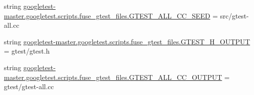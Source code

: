 \begin{DoxyCompactItemize}
\item 
string \mbox{\hyperlink{namespacegoogletest-master_1_1googletest_1_1scripts_1_1fuse__gtest__files_a44f0789f9d702f1e4c63394f232cfd63}{googletest-\/master.\+googletest.\+scripts.\+fuse\+\_\+gtest\+\_\+files.\+G\+T\+E\+S\+T\+\_\+\+A\+L\+L\+\_\+\+C\+C\+\_\+\+S\+E\+ED}} = \textquotesingle{}src/gtest-\/all.\+cc\textquotesingle{}
\item 
string \mbox{\hyperlink{namespacegoogletest-master_1_1googletest_1_1scripts_1_1fuse__gtest__files_a088172bd6845dc24b0281f586c5e789f}{googletest-\/master.\+googletest.\+scripts.\+fuse\+\_\+gtest\+\_\+files.\+G\+T\+E\+S\+T\+\_\+\+H\+\_\+\+O\+U\+T\+P\+UT}} = \textquotesingle{}gtest/gtest.\+h\textquotesingle{}
\item 
string \mbox{\hyperlink{namespacegoogletest-master_1_1googletest_1_1scripts_1_1fuse__gtest__files_a8bbf3d8d0144c7c81c713209212e4cff}{googletest-\/master.\+googletest.\+scripts.\+fuse\+\_\+gtest\+\_\+files.\+G\+T\+E\+S\+T\+\_\+\+A\+L\+L\+\_\+\+C\+C\+\_\+\+O\+U\+T\+P\+UT}} = \textquotesingle{}gtest/gtest-\/all.\+cc\textquotesingle{}
\end{DoxyCompactItemize}
